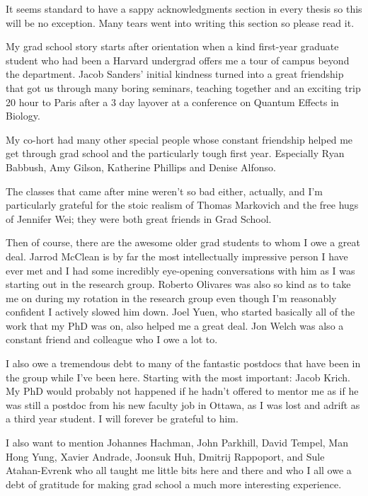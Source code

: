 
It seems standard to have a sappy acknowledgments section in every thesis so this will be no exception.  Many tears went into writing this section so please read it.

My grad school story starts after orientation when a kind first-year graduate student who had been a Harvard undergrad offers me a tour of campus beyond the department.  Jacob Sanders' initial kindness turned into a great friendship that got us through many boring seminars, teaching together and an exciting trip 20 hour to Paris after a 3 day layover at a conference on Quantum Effects in Biology.

My co-hort had many other special people whose constant friendship helped me get through grad school and the particularly tough first year.  Especially Ryan Babbush, Amy Gilson, Katherine Phillips and Denise Alfonso.

The classes that came after mine weren't so bad either, actually, and I'm particularly grateful for the stoic realism of Thomas Markovich and the free hugs of Jennifer Wei; they were both great friends in Grad School.

Then of course, there are the awesome older grad students to whom I owe a great deal.  Jarrod McClean is by far the most intellectually impressive person I have ever met and I had some incredibly eye-opening conversations with him as I was starting out in the research group.  Roberto Olivares was also so kind as to take me on during my rotation in the research group even though I'm reasonably confident I actively slowed him down.  Joel Yuen, who started basically all of the work that my PhD was on, also helped me a great deal.  Jon Welch was also a constant friend and colleague who I owe a lot to.

I also owe a tremendous debt to many of the fantastic postdocs that have been in the group while I've been here.  Starting with the most important: Jacob Krich.  My PhD would probably not happened if he hadn't offered to mentor me as if he was still a postdoc from his new faculty job in Ottawa, as I was lost and adrift as a third year student.  I will forever be grateful to him.

I also want to mention Johannes Hachman, John Parkhill, David Tempel, Man Hong Yung, Xavier Andrade, Joonsuk Huh, Dmitrij Rappoport, and Sule Atahan-Evrenk who all taught me little bits here and there and who I all owe a debt of gratitude for making grad school a much more interesting experience.

